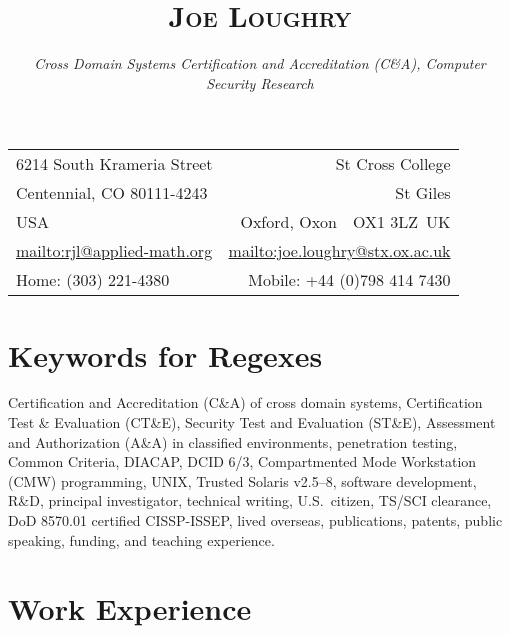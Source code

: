 \documentclass[letterpaper]{article}
\date{}
\title{\textsc{Joe Loughry}\vspace{-8mm}}
\author{\hspace{-4mm}\emph{Cross Domain Systems Certification and Accreditation (C\&A),
	Computer Security Research}
}
\begin{document}
\maketitle

\vspace{-7mm}\hspace{-3mm}
\begin{tabular*}{\textwidth}{l@{\extracolsep{\fill}}r}
	6214 South Krameria Street       & St Cross College \\
	Centennial, CO 80111-4243        & St Giles \\
	USA                              & Oxford, Oxon\ \ OX1 3LZ\ UK \\
	\url{mailto:rjl@applied-math.org} & \url{mailto:joe.loughry@stx.ox.ac.uk} \\
	Home: (303) 221-4380             & Mobile: +44 (0)798 414 7430 \\
\end{tabular*}

\section*{Keywords for Regexes} %

Certification and Accreditation (C\&A) of cross domain systems, Certification Test \&
Evaluation (CT\&E), Security Test and Evaluation (ST\&E), Assessment and Authorization (A\&A)
in classified environments, penetration testing,
Common Criteria, DIACAP, DCID 6/3, Compartmented Mode Workstation (CMW) programming,
UNIX, Trusted Solaris v2.5--8, software development, R\&D, principal investigator,
technical writing, U.S.\ citizen, TS/SCI clearance, DoD 8570.01 certified CISSP-ISSEP,
lived overseas, publications, patents, public speaking, funding, and teaching experience.

\section*{Work Experience} %
\end{document}
